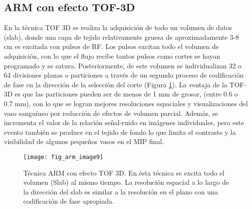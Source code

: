 \subsection{ARM con efecto TOF-3D}
En la técnica TOF 3D se realiza la adquisición de todo un volumen de datos (slab), donde una capa de tejido relativamente gruesa de aproximadamente 3-8 cm es excitada con pulsos de RF. Los pulsos excitan todo el volumen de adquisición, con lo que el flujo recibe tantos pulsos como cortes se hayan programado y se satura. Posteriormente, de este volumen se individualizan 32 o 64 divisiones planas o particiones a través de un segundo proceso de codificación de fase en la dirección de la selección del corte (Figura \ref{fig:arm_image9}). La ventaja de la TOF-3D es que las particiones pueden ser de menos de 1 mm de grosor, (entre 0.6 o 0.7 mm), con lo que se logran mejores resoluciones espaciales y visualizaciones del vaso sanguíneo por reducción de efectos de volumen parcial. Además, se incrementa el valor de la relación señal-ruido en imágenes individuales, pero este evento también se produce en el tejido de fondo lo que limita el contraste y la visibilidad de algunos pequeños vasos en el MIP final. 

\begin{figure}[htbp]
\begin{figg}
 \texttt{[image: fig\_arm\_image9]}
 \caption{
Técnica ARM con efecto TOF 3D. En ésta técnica se excita todo el volumen (Slab) al mismo tiempo. La resolución espacial a lo largo de la dirección del slab es similar a la resolución en el plano con una codificación de fase apropiada. 
 }
 \label{fig:arm_image9}
\end{figg}
\end{figure}




